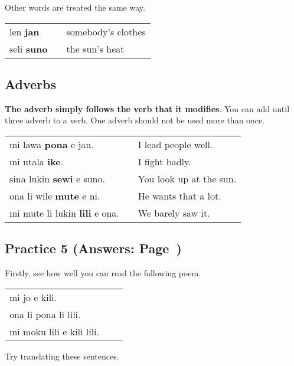Other words are treated the same way. 

\begin{supertabular}{p{5,5cm}|ll}
len \textbf{jan} && somebody's clothes \\
seli \textbf{suno} && the sun's heat \\
\end{supertabular} 

\subsection*{Adverbs}
\textbf{The adverb simply follows the verb that it modifies}. 
You can add until three adverb to a verb. 
One adverb should not be used more than once.

\begin{supertabular}{p{5,5cm}|ll}
mi lawa \textbf{pona} e jan. && I lead people well. \\
mi utala \textbf{ike}. && I fight badly. \\
sina lukin \textbf{sewi} e suno. && You look up at the sun. \\
ona li wile \textbf{mute} e ni. && He wants that a lot. \\
mi mute li lukin \textbf{lili} e ona. && We barely saw it. \\
\end{supertabular} 

\newpage
\subsection*{Practice 5 (Answers: Page~\pageref{'adjectives_compund_nouns_adverbs'})}
Firstly, see how well you can read the following poem. 

\begin{supertabular}{p{5,5cm}|ll}
mi jo e kili. && \\ %
ona li pona li lili. && \\ %
mi moku lili e kili lili. && \\ %
\end{supertabular} 

Try translating these sentences. 

